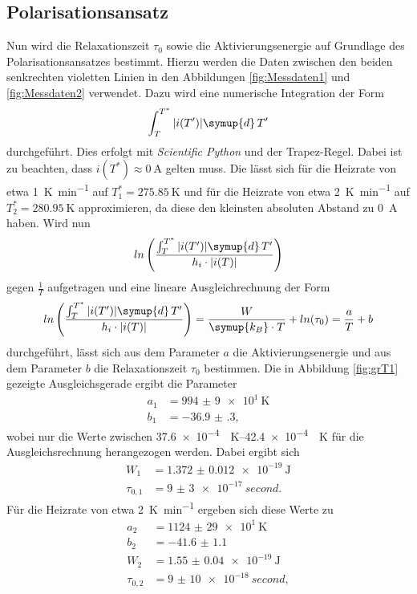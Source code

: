 \subsection{Polarisationsansatz}
\label{sec:grT}
Nun wird die Relaxationszeit $\tau_0$ sowie die Aktivierungsenergie auf Grundlage des Polarisationsansatzes bestimmt.
Hierzu werden die Daten zwischen den beiden senkrechten violetten Linien in den Abbildungen \ref{fig:Messdaten1} und \ref{fig:Messdaten2} verwendet.
Dazu wird eine numerische Integration der Form
\begin{equation}
    \label{eqn:int}
    \int_T^{T^*} |i(T')| \symup{d}\,T'
\end{equation}
durchgeführt. Dies erfolgt mit \textit{Scientific Python} \cite{scipy} und der Trapez-Regel. Dabei ist zu beachten, dass $i(T^*) \approx \SI{0}{\ampere}$ gelten muss.
Die lässt sich für die Heizrate von etwa \SI{1}{\kelvin\per\minute} auf $T^*_1 = \SI{275.85}{\kelvin}$ und für die Heizrate von etwa \SI{2}{\kelvin\per\minute} 
auf $T^*_2 = \SI{280.95}{\kelvin}$ approximieren, da diese den kleinsten absoluten Abstand zu \SI{0}{\ampere} haben.
Wird nun
\begin{equation*}
    ln\left(\frac{\int_T^{T^*} |i(T')| \symup{d}\,T'}{h_i \cdot |i(T)|}\right)
\end{equation*}
gegen $\frac{1}{T}$ aufgetragen und eine lineare Ausgleichrechnung der Form
\begin{equation}
    \label{eqn:lin2}
    ln\left(\frac{\int_T^{T^*} |i(T')| \symup{d}\,T'}{h_i \cdot |i(T)|}\right) = \frac{W}{\symup{k_B} \cdot T} + ln(\tau_0) = \frac{a}{T} + b
\end{equation}
durchgeführt, lässt sich aus dem Parameter $a$ die Aktivierungsenergie und aus dem Parameter $b$ die Relaxationszeit $\tau_0$ bestimmen.
Die in Abbildung \ref{fig:grT1} gezeigte Ausgleichsgerade ergibt die Parameter
\begin{align*}
    a_1 &= \SI{994(9)e1}{\kelvin} \\
    b_1 &= \num{-36.9(3)},
\end{align*}
wobei nur die Werte zwischen \SIrange{37.6e-4}{42.4e-4}{\per\kelvin} für die Ausgleichsrechnung herangezogen werden. Dabei ergibt sich
\begin{align*}
    W_1 &= \SI{1.372(12)e-19}{\joule} \\
    \tau_{0,1} &= \SI{9(3)e-17}{second}.
\end{align*}
Für die Heizrate von etwa \SI{2}{\kelvin\per\minute} ergeben sich diese Werte zu
\begin{align*}
    a_2 &= \SI{1124(29)e1}{\kelvin} \\
    b_2 &= \num{-41.6(11)} \\
    W_2 &= \SI{1.55(4)e-19}{\joule} \\
    \tau_{0,2} &= \SI{9(10)e-18}{second},
\end{align*}
